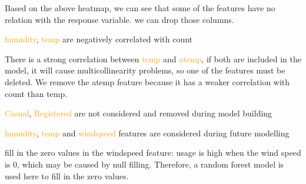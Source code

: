 \documentclass{tikzposter} %
\begin{document}
\begin{columns}
{\begin{description}
  \item Based on the above heatmap, we can see that some of the features have no relation with the response variable. we can drop those columns.
  	\item\textcolor{orange} {humidity}, \textcolor{orange}{temp} are negatively correlated with count
  	\item
    There is a strong correlation between \textcolor{orange} {temp} and \textcolor{orange} {atemp}, if both are included in the model, it will cause multicollinearity problems, so one of the features must be deleted. We remove the atemp feature because it has a weaker correlation with count than temp.
    \item
    \textcolor{orange} {Casual}, \textcolor{orange}{Registered} are not considered and removed during model building 
    \item
    \textcolor{orange} {humidity}, \textcolor{orange}{temp} and \textcolor{orange} {windspeed} features are considered during future modelling
    \item 
    fill in the zero values in the windspeed feature: usage is high when the wind speed is 0, which may be caused by null filling. Therefore, a random forest model is used here to fill in the zero values.

\end{description}

}






\end{columns}
\end{document}
